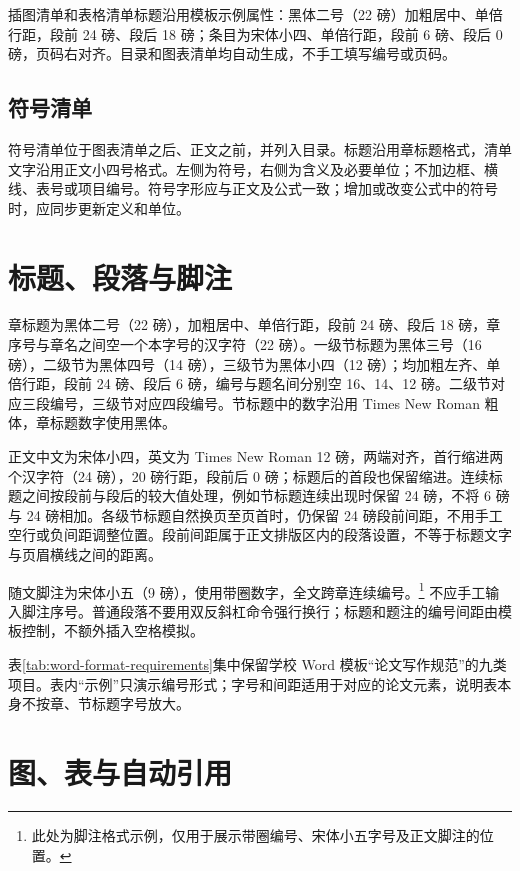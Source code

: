 插图清单和表格清单标题沿用模板示例属性：黑体二号（22 磅）加粗居中、单倍行距，段前 24 磅、段后 18 磅；条目为宋体小四、单倍行距，段前 6 磅、段后 0 磅，页码右对齐。目录和图表清单均自动生成，不手工填写编号或页码。

\subsection{符号清单}

符号清单位于图表清单之后、正文之前，并列入目录。标题沿用章标题格式，清单文字沿用正文小四号格式。左侧为符号，右侧为含义及必要单位；不加边框、横线、表号或项目编号。符号字形应与正文及公式一致；增加或改变公式中的符号时，应同步更新定义和单位。

\section{标题、段落与脚注}

章标题为黑体二号（22 磅），加粗居中、单倍行距，段前 24 磅、段后 18 磅，章序号与章名之间空一个本字号的汉字符（22 磅）。一级节标题为黑体三号（16 磅），二级节为黑体四号（14 磅），三级节为黑体小四（12 磅）；均加粗左齐、单倍行距，段前 24 磅、段后 6 磅，编号与题名间分别空 16、14、12 磅。二级节对应三段编号，三级节对应四段编号。节标题中的数字沿用 Times New Roman 粗体，章标题数字使用黑体。

正文中文为宋体小四，英文为 Times New Roman 12 磅，两端对齐，首行缩进两个汉字符（24 磅），20 磅行距，段前后 0 磅；标题后的首段也保留缩进。连续标题之间按段前与段后的较大值处理，例如节标题连续出现时保留 24 磅，不将 6 磅与 24 磅相加。各级节标题自然换页至页首时，仍保留 24 磅段前间距，不用手工空行或负间距调整位置。段前间距属于正文排版区内的段落设置，不等于标题文字与页眉横线之间的距离。

随文脚注为宋体小五（9 磅），使用带圈数字，全文跨章连续编号。\footnote{此处为脚注格式示例，仅用于展示带圈编号、宋体小五字号及正文脚注的位置。} 不应手工输入脚注序号。普通段落不要用双反斜杠命令强行换行；标题和题注的编号间距由模板控制，不额外插入空格模拟。

表\ref{tab:word-format-requirements}集中保留学校 Word 模板“论文写作规范”的九类项目。表内“示例”只演示编号形式；字号和间距适用于对应的论文元素，说明表本身不按章、节标题字号放大。


\section{图、表与自动引用}


